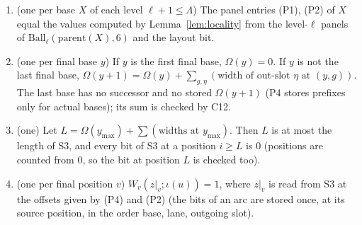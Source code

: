 \documentclass[11pt]{article}
\theoremstyle{definition}
\theoremstyle{remark}
\newcommand{\Ball}{\mathrm{Ball}}
\begin{document}
\begin{enumerate}
\item[C10] (one per base $X$ of each level $\ell+1\le\Lambda$) The panel entries (P1), (P2) of $X$ equal the values computed by
  Lemma~\ref{lem:locality} from the level-$\ell$ panels of $\Ball_\ell(\mathrm{parent}(X),6)$ and the layout bit.
\item[C11] (one per final base $y$) If $y$ is the first final base, $\Omega(y)=0$. If $y$ is not the last final base,
  $\Omega(y+1)=\Omega(y)+\sum_{g,\eta}(\text{width of out-slot }\eta\text{ at }(y,g))$. The last base has no successor and no
  stored $\Omega(y+1)$ (P4 stores prefixes only for actual bases); its sum is checked by C12.
\item[C12] (one) Let $L=\Omega(y_{\max})+\sum(\text{widths at }y_{\max})$. Then $L$ is at most the length of S3, and every bit of S3
  at a position $i\ge L$ is $0$ (positions are counted from $0$, so the bit at position $L$ is checked too).
\item[C13] (one per final position $v$) $W_v(z|_v;\iota(u))=1$, where $z|_v$ is read from S3 at the offsets given by (P4) and (P2)
  (the bits of an arc are stored once, at its source position, in the order base, lane, outgoing slot).
\end{enumerate}
\end{document}
